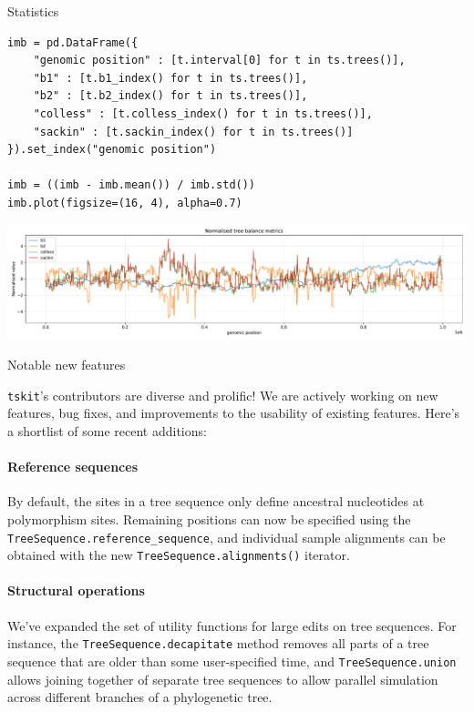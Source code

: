 \documentclass[landscape,a0paper,fontscale=0.5]{baposter}
\newcommand{\tskit}{{\texttt{tskit}}}
\begin{document}
\begin{poster}
\begin{posterbox}[name=stats,column=3,row=0,span=1]{Statistics}
\begin{verbatim}
imb = pd.DataFrame({
    "genomic position" : [t.interval[0] for t in ts.trees()],
    "b1" : [t.b1_index() for t in ts.trees()],
    "b2" : [t.b2_index() for t in ts.trees()],
    "colless" : [t.colless_index() for t in ts.trees()],
    "sackin" : [t.sackin_index() for t in ts.trees()]
}).set_index("genomic position")

imb = ((imb - imb.mean()) / imb.std())
imb.plot(figsize=(16, 4), alpha=0.7)
\end{verbatim}
\includegraphics[width=\textwidth]{tree_balance}

\end{posterbox}


\begin{posterbox}[name=operations,column=3,below=stats,span=1]{Notable new features}


\tskit{}'s contributors are diverse and prolific! We are actively working on
    new features, bug fixes, and improvements to the usability of existing
    features. Here's a shortlist of some recent additions:

\paragraph{Reference sequences}
By default, the sites in a tree sequence only define ancestral nucleotides at
    polymorphism sites. Remaining positions can now be specified using the
    \texttt{TreeSequence.reference\_sequence}, and individual sample alignments can
    be obtained with the new \texttt{TreeSequence.alignments()} iterator.

\paragraph{Structural operations}
We've expanded the set of utility functions for large edits on tree sequences.
    For instance, the \texttt{TreeSequence.decapitate} method removes all parts of a
    tree sequence that are older than some user-specified time,
    and \texttt{TreeSequence.union} allows joining together of separate tree sequences
    to allow parallel simulation across different branches of a phylogenetic tree.


\end{posterbox}
\end{poster}
\end{document}
